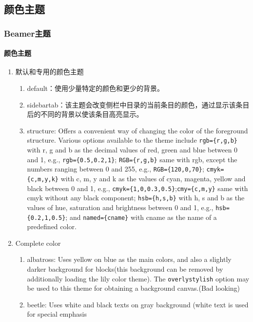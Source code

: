 \documentclass{beamer}
\begin{document}
\subsection{颜色主题}
\begin{frame}
\frametitle{Beamer主题}
\framesubtitle{颜色主题}
\begin{enumerate}[I]
\item 默认和专用的颜色主题
\begin{enumerate}
\item default：使用少量特定的颜色和更少的背景。
\item sidebartab：该主题会改变侧栏中目录的当前条目的颜色，通过显示该条目后的不同的背景以使该条目高亮显示。
\item structure: Offers a convenient way of changing the color of the foreground structure. Various
options available to the theme include \verb|rgb={r,g,b}| with r, g and b as the decimal
values of red, green and blue between 0 and 1, e.g., \verb|rgb={0.5,0.2,1}|; \verb|RGB={r,g,b}| same with rgb, except the numbers ranging between 0 and 255, e.g., \verb|RGB={120,0,70}|; \verb|cmyk={c,m,y,k}| with c, m, y and k as the values of cyan, magenta, yellow and black between 0 and 1, e.g., \verb|cmyk={1,0,0.3,0.5}|;\verb|cmy={c,m,y}| same with cmyk without any black component; \verb|hsb={h,s,b}| with h, s and b as the values of hue, saturation and brightness between 0 and 1, e.g., \verb|hsb={0.2,1,0.5}|; and \verb|named={cname}| with cname as the name of a predefined color.
\end{enumerate}
\item Complete color
\begin{enumerate}
\item albatross: Uses yellow on blue as the main colors, and also a slightly darker background for blocks(this background can be removed by additionally loading the lily color theme). The \verb|overlystylish| option may be used to this theme for obtaining a background canvas.(Bad looking)
\item beetle: Uses white and black texts on gray background (white text is used for special emphasis

\end{enumerate}
\end{enumerate}
\end{frame}
\end{document}
